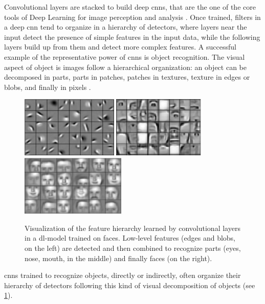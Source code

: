 Convolutional layers are stacked to build deep \glspl{cnn}, that are the one of the core tools of Deep Learning for image perception and analysis \cite{}.
Once trained, filters in a deep \gls{cnn} tend to organize in a hierarchy of detectors, where layers near the input detect the presence of simple features in the input data, while the following layers build up from them and detect more complex features.
A successful example of the representative power of \glspl{cnn} is object recognition.
The visual aspect of object is images follow a hierarchical organization: an object can be decomposed in parts, parts in patches, patches in textures, texture in edges or blobs, and finally in pixels \cite{}.
\begin{figure}
    \centering
    \includegraphics[height=2.9cm]{img/feat-hier-1.png}%
    \hfill%
    \includegraphics[height=2.9cm]{img/feat-hier-2.png}%
    \hfill%
    \includegraphics[height=2.9cm]{img/feat-hier-3.png}%
    \newline
    \caption{
    Visualization of the feature hierarchy learned by convolutional layers in a \gls{dl}-model trained on faces.
    Low-level features (edges and blobs, on the left) are detected and then combined to recognize parts (eyes, nose, mouth, in the middle) and finally faces (on the right).
    }
    \label{fig:back:filter-hier}
\end{figure}
\Glspl{cnn} trained to recognize objects, directly or indirectly, often organize their hierarchy of detectors following this kind of visual decomposition of objects (see \ref{fig:back:filter-hier}).


